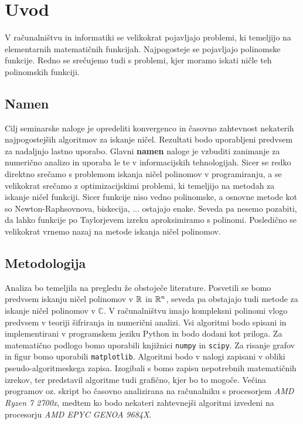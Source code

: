 \chapter{Uvod}
V računalništvu in informatiki se velikokrat pojavljajo problemi, ki temeljijo na elementarnih matematičnih funkcijah. Najpogosteje se pojavljajo polinomske funkcije. Redno se srečujemo tudi s problemi, kjer moramo iskati ničle teh polinomskih funkciji. 

\section{Namen}
Cilj seminarske naloge je opredeliti konvergenco in časovno zahtevnost nekaterih najpogostejših algoritmov za iskanje ničel. Rezultati bodo uporabljeni predvsem za nadaljnjo lastno uporabo. Glavni \textbf{namen} naloge je vzbuditi zanimanje za numerično analizo in uporaba le te v informacijskih tehnologijah. Sicer se redko direktno srečamo s problemom iskanja ničel polinomov v programiranju, a se velikokrat srečamo z optimizacijskimi problemi, ki temeljijo na metodah za iskanje ničel funkciji. Sicer funkcije niso vedno polinomske, a osnovne metode kot so Newton-Raphsovnova, biskecija, ... ostajajo enake. Seveda pa nesemo pozabiti, da lahko funkcije po Taylorjevem izreku aproksimiramo s polinomi. Posledično se velikokrat vrnemo nazaj na metode iskanja ničel polinomov.

\section{Metodologija}
Analiza bo temeljila na pregledu že obstoječe literature. Posvetili se bomo predvsem iskanju ničel polinomov v $\mathbb{R}$ in $\mathbb{R}^n$, seveda pa obstajajo tudi metode za iskanje ničel polinomov v $\mathbb{C}$. V računalništvu imajo kompleksni polinomi vlogo predvsem v teoriji šifriranja in numerični analizi. Vsi algoritmi bodo spisani in implementirani v programskem jeziku Python in bodo dodani kot priloga. Za matematično podlogo bomo uporabili knjižnici \texttt{numpy} in \texttt{scipy}. Za risanje grafov in figur bomo uporabili \texttt{matplotlib}. Algoritmi bodo v nalogi zapisani v obliki pseudo-algoritmeskega zapisa. Izogibali s bomo zapisu nepotrebnih matematičnih izrekov, ter predstavil algoritme tudi grafično, kjer bo to mogoče. Večina programov oz. skript bo časovno analizirana na računalniku s procesorjem \textit{AMD Ryzen 7 2700x}, medtem ko bodo nekateri zahtevnejši algoritmi izvedeni na procesorju \textit{AMD EPYC GENOA 9684X}.

